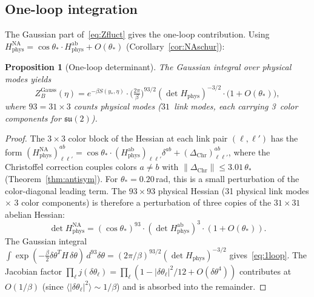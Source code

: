 \documentclass[11pt]{article}
\newtheorem{proposition}[theorem]{Proposition}
\theoremstyle{definition}
\newcommand{\su}{\mathfrak{su}}
\begin{document}
\subsection{One-loop integration}\label{subsec:oneloop}

The Gaussian part of~\eqref{eq:Zfluct} gives the one-loop
contribution.  Using
$H_{\mathrm{phys}}^{\mathrm{NA}}=\cos\theta_*\cdot
H_{\mathrm{phys}}^{\mathrm{ab}}
+O(\theta_*)$ (Corollary~\ref{cor:NAschur}):

\begin{proposition}[One-loop determinant]\label{prop:oneloop}
The Gaussian integral over physical modes yields
\begin{equation}\label{eq:1loop}
Z_B^{\mathrm{Gauss}}(\eta)=e^{-\beta S(y_*,\eta)}
\cdot\bigl(\tfrac{2\pi}{\beta}\bigr)^{93/2}
(\det H_{\mathrm{phys}})^{-3/2}
\cdot\bigl(1+O(\theta_*)\bigr),
\end{equation}
where $93=31\times 3$ counts physical modes ($31$~link modes, each
carrying 3~color components for $\su(2)$).
\end{proposition}

\begin{proof}
The $3\times 3$ color block of the Hessian at each link pair
$(\ell,\ell')$ has the form
$(H_{\mathrm{phys}}^{\mathrm{NA}})^{ab}_{\ell\ell'}
=\cos\theta_*\cdot(H_{\mathrm{phys}}^{\mathrm{ab}})_{\ell\ell'}\delta^{ab}
+(\Delta_{\mathrm{Chr}})^{ab}_{\ell\ell'}$,
where the Christoffel correction couples colors $a\ne b$
with $\|\Delta_{\mathrm{Chr}}\|\le 3.01\,\theta_*$
(Theorem~\ref{thm:antisym}).  For $\theta_*=0.20$\,rad,
this is a small perturbation of the color-diagonal leading term.
The $93\times 93$ physical Hessian (31 physical link modes
$\times$ 3 color components) is therefore a
perturbation of three copies of the $31\times 31$ abelian Hessian:
\begin{equation}
\det H_{\mathrm{phys}}^{\mathrm{NA}}
=(\cos\theta_*)^{93}\cdot(\det H_{\mathrm{phys}}^{\mathrm{ab}})^3
\cdot(1+O(\theta_*)).
\end{equation}
The Gaussian integral $\int\exp(-\frac{\beta}{2}\delta\theta^T
H\,\delta\theta)\,d^{93}\delta\theta
=(2\pi/\beta)^{93/2}(\det H_{\mathrm{phys}})^{-3/2}$
gives~\eqref{eq:1loop}.  The Jacobian factor $\prod_\ell j(\delta\theta_\ell)
=\prod_\ell(1-|\delta\theta_\ell|^2/12+O(\delta\theta^4))$
contributes at $O(1/\beta)$ (since
$\langle|\delta\theta_\ell|^2\rangle\sim 1/\beta$) and is absorbed
into the remainder.
\end{proof}
\end{document}
